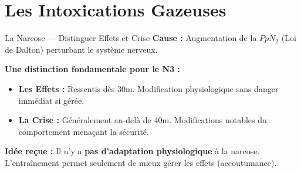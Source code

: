 \section{Les Intoxications Gazeuses}

\begin{frame}{La Narcose — Distinguer Effets et Crise}
    \textbf{Cause :} Augmentation de la $PpN_2$ (Loi de Dalton) perturbant le système nerveux.
    
    \textbf{Une distinction fondamentale pour le N3 :}
    \begin{itemize}
        \item \textbf{\textcolor{ffessmred}{Les Effets :}} Ressentis dès 30m. Modification physiologique sans danger immédiat si gérée.
        \item \textbf{\textcolor{ffessmred}{La Crise :}} Généralement au-delà de 40m. Modifications notables du comportement menaçant la sécurité.
    \end{itemize}
    
    \textbf{Idée reçue :} Il n'y a \textbf{\textcolor{ffessmred}{pas d'adaptation physiologique}} à la narcose. 
    L'entraînement permet seulement de mieux gérer les effets (accoutumance).
\end{frame}

